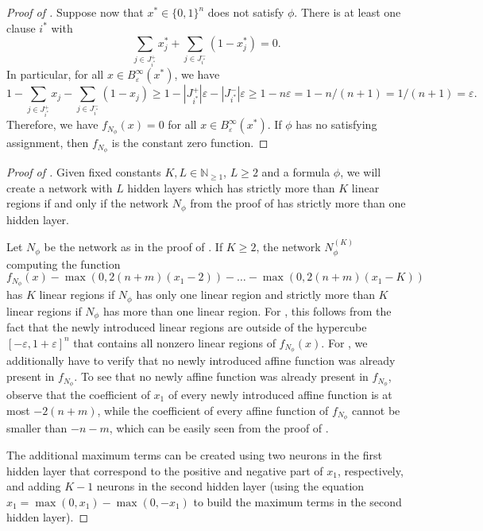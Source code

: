 \documentclass{article}
\begin{document}
\begin{proof}[Proof of ]
Suppose now that $x^*\in \{0,1\}^n$ does not satisfy $\phi$.
There is at least one clause $i^*$ with
\[
\sum_{j\in J^+_{i^*}}x^*_j+\sum_{j\in J^-_{i^*}}(1-x^*_j)= 0.
\]
In particular, for all $x\in B^\infty_\varepsilon(x^*)$, we have
\[
1-\sum_{j\in J^+_{i^*}}x_j-\sum_{j\in J^-_{i^*}}(1-x_j)
\geq
1 - |J^+_{i^*}|\varepsilon - |J^-_{i^*}|\varepsilon
\geq 1 - n \varepsilon
= 1 - n / (n+1)
= 1 / (n+1)
=\varepsilon.
\]
Therefore, we have $f_{N_\phi}(x)=0$ for all $x\in B^\infty_\varepsilon(x^*)$.
If $\phi$ has no satisfying assignment, then $f_{N_\phi}$ is the constant zero function.
\end{proof}
\begin{proof}[Proof of ]
Given fixed constants $K, L\in \mathbb{N}_{\geq 1}$, $L\geq 2$ and a \SAT{} formula $\phi$, we will create a network with $L$ hidden layers which has strictly more than $K$ linear regions if and only if the network $N_\phi$ from the proof of  has strictly more than one hidden layer.

Let $N_\phi$ be the network as in the proof of .
If $K\geq 2$, the network $N^{(K)}_\phi$ computing the function
\[
f_{N_\phi}(x)
-
\max(0,2(n+m)(x_1-2))-\dots - \max(0,2(n+m)(x_1-K))
\]
has $K$ linear regions if $N_\phi$ has only one linear region and strictly more than $K$ linear regions if $N_\phi$ has more than one linear region.
For , this follows from the fact that the newly introduced linear regions are outside of the hypercube $[-\varepsilon,1+\varepsilon]^n$ that contains all nonzero linear regions of $f_{N_\phi}(x)$.
For , we additionally have to verify that no newly introduced affine function was already present in $f_{N_\phi}$.
To see that no newly affine function was already present in $f_{N_\phi}$, observe that the coefficient of $x_1$ of every newly introduced affine function is at most $-2(n+m)$, while the coefficient of every affine function of $f_{N_\phi}$ cannot be smaller than $-n-m$, which can be easily seen from the proof of .

The additional maximum terms can be created using two neurons in the first hidden layer that correspond to the positive and negative part of $x_1$, respectively, and adding $K-1$ neurons in the second hidden layer (using the equation $x_1=\max(0, x_1)-\max(0,-x_1)$ to build the maximum terms in the second hidden layer).


\end{proof}
\end{document}
